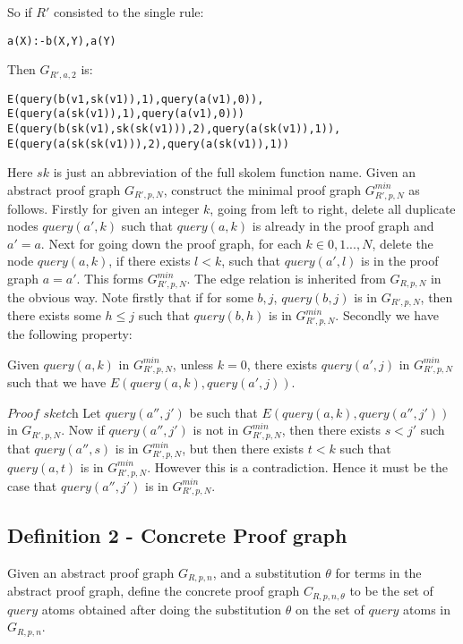\documentclass[sigconf]{acmart}
\begin{document}
So if $R'$ consisted to the single rule:
\begin{verbatim}
a(X):-b(X,Y),a(Y)
\end{verbatim}
Then $G_{R',a,2}$ is:
\begin{verbatim}
E(query(b(v1,sk(v1)),1),query(a(v1),0)),
E(query(a(sk(v1)),1),query(a(v1),0)))
E(query(b(sk(v1),sk(sk(v1))),2),query(a(sk(v1)),1)),
E(query(a(sk(sk(v1))),2),query(a(sk(v1)),1)) \end{verbatim}
Here $sk$ is just an abbreviation of the full skolem function name. 
Given an abstract proof graph $G_{R',p,N}$, construct the minimal proof graph $G_{R',p,N}^{min}$ as follows. Firstly for given an integer $k$, going from left to right, delete all duplicate nodes $query(a',k)$ such that $query(a,k)$ is already in the proof graph and $a'=a$. Next for going down the proof graph, for each $k\in {0,1...,N}$, delete the node $query(a,k)$, if there exists $l<k$, such that $query(a',l)$ is in the proof graph $a=a'$. This forms $G_{R',p,N}^{min}$. The edge relation is inherited from $G_{R,p,N}$ in the obvious way. Note firstly that if for some $b,j$, $query(b,j)$ is in $G_{R',p,N}$, then there exists some $h\leq j$ such that $query(b,h)$ is in $G_{R',p,N}^{min}$. Secondly we have the following property:
\begin{lemma}
Given $query(a,k)$ in $G_{R',p,N}^{min}$, unless $k=0$, there exists $query(a',j)$ in $G_{R',p,N}^{min}$ such that we have $E(query(a,k),query(a',j))$.  
\end{lemma}
$\textit{Proof sketch}$ Let $query(a'',j')$ be such that $E(query(a,k),query(a'',j'))$ in $G_{R',p,N}$. Now if $query(a'',j')$ is not in $G_{R',p,N}^{min}$, then there exists $s<j'$ such that $query(a'',s)$ is in $G_{R',p,N}^{min}$, but then there exists $t<k$ such that $query(a,t)$ is in $G_{R',p,N}^{min}$. However this is a contradiction. Hence it must be the case that $query(a'',j')$ is in $G_{R',p,N}^{min}$. 



\subsection{Definition 2 - Concrete Proof graph}

Given an abstract proof graph $G_{R,p,n}$, and a substitution $\theta$ for
terms in the abstract proof graph, define the concrete proof graph
$C_{R,p,n,\theta}$ to be the set of $query$ atoms obtained after doing the
substitution $\theta$ on the set of $query$ atoms in $G_{R,p,n}$.
\end{document}
